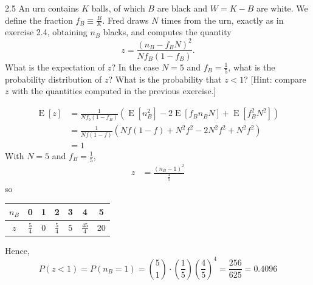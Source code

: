\documentclass[12pt, a4paper]{article}
\begin{document}
\begin{prob}{2.5}
    An urn contains $K$ balls, of which $B$ are black and $W = K - B$ are white. We define the fraction $f_B \equiv \frac{B}{K}$. Fred draws $N$
times from the urn, exactly as in exercise 2.4, obtaining $n_B$ blacks, and
computes the quantity
\begin{equation}
z = \frac{(n_B - f_BN)^2}{Nf_B(1 - f_B)}. \tag{2.19}
\end{equation}
What is the expectation of $z$? In the case $N = 5$ and $f_B = \frac{1}{5}$, what
is the probability distribution of $z$? What is the probability that $z < 1$?
[Hint: compare $z$ with the quantities computed in the previous exercise.]
\end{prob}
\begin{sol}
\begin{align*}
    \operatorname{E}[z] &= \frac{1}{Nf_b(1-f_B)}(\operatorname{E}[n_B^2] - 2\operatorname{E}[f_B n_B N] + \operatorname{E}[f_B^2 N^2]) \\
    &= \frac{1}{Nf(1-f)}(Nf(1-f) + N^2f^2 - 2N^2 f^2 + N^2f^2) \\
    &= 1
\end{align*}
With $N = 5$ and $f_B = \frac{1}{5}$,
\begin{align*}
    z &= \frac{(n_B - 1)^2}{\frac{4}{5}}
\end{align*}
so
\begin{center}
\begin{tabular}{|c|cccccc|}
    \hline
    $n_B$ & 0 & 1 & 2 & 3 & 4 & 5 \\
    \hline
    $z$ &\rule[-12pt]{0pt}{30pt} $\frac{5}{4}$ & 0 & $\frac{5}{4}$ & $5$ & $\frac{45}{4}$ & 20 \\
    \hline
\end{tabular}
\end{center}

Hence, 
$$P(z < 1) = P(n_B = 1) = \binom{5}{1} \cdot \left(\frac{1}{5}\right) \left(\frac{4}{5}\right)^4 = \frac{256}{625} = 0.4096$$
\end{sol}
\bigskip
\end{document}
